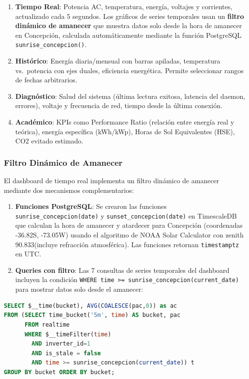 \documentclass[12pt,a4paper]{article}
\begin{document}
\begin{enumerate}
    \item \textbf{Tiempo Real}: Potencia AC, temperatura, energ\'ia, voltajes y corrientes, actualizado cada 5 segundos. Los gr\'aficos de series temporales usan un \textbf{filtro din\'amico de amanecer} que muestra datos solo desde la hora de amanecer en Concepci\'on, calculada autom\'aticamente mediante la funci\'on PostgreSQL \texttt{sunrise\_concepcion()}.
    \item \textbf{Hist\'orico}: Energ\'ia diaria/mensual con barras apiladas, temperatura vs.\ potencia con ejes duales, eficiencia energ\'etica. Permite seleccionar rangos de fechas arbitrarios.
    \item \textbf{Diagn\'ostico}: Salud del sistema (\'ultima lectura exitosa, latencia del daemon, errores), voltaje y frecuencia de red, tiempo desde la \'ultima conexi\'on.
    \item \textbf{Acad\'emico}: KPIs como Performance Ratio (relaci\'on entre energ\'ia real y te\'orica), energ\'ia espec\'ifica (kWh/kWp), Horas de Sol Equivalentes (HSE), CO2 evitado estimado.
\end{enumerate}

\subsubsection{Filtro Din\'amico de Amanecer}

El dashboard de tiempo real implementa un filtro din\'amico de amanecer mediante dos mecanismos complementarios:

\begin{enumerate}
    \item \textbf{Funciones PostgreSQL}: Se crearon las funciones \texttt{sunrise\_concepcion(date)} y \texttt{sunset\_concepcion(date)} en TimescaleDB que calculan la hora de amanecer y atardecer para Concepci\'on (coordenadas -36.82\textdegree S, -73.05\textdegree W) usando el algoritmo de NOAA Solar Calculator con zenith 90.833\textdegree (incluye refracci\'on atmosf\'erica). Las funciones retornan \texttt{timestamptz} en UTC.

    \item \textbf{Queries con filtro}: Las 7 consultas de series temporales del dashboard incluyen la condici\'on \texttt{WHERE time >= sunrise\_concepcion(current\_date)} para mostrar datos solo desde el amanecer:
\end{enumerate}

\begin{lstlisting}[language=SQL, caption={Ejemplo de query con filtro de amanecer}]
SELECT $__time(bucket), AVG(COALESCE(pac,0)) as ac
FROM (SELECT time_bucket('5m', time) AS bucket, pac
      FROM realtime
      WHERE $__timeFilter(time)
        AND inverter_id=1
        AND is_stale = false
        AND time >= sunrise_concepcion(current_date)) t
GROUP BY bucket ORDER BY bucket;
\end{lstlisting}
\end{document}
